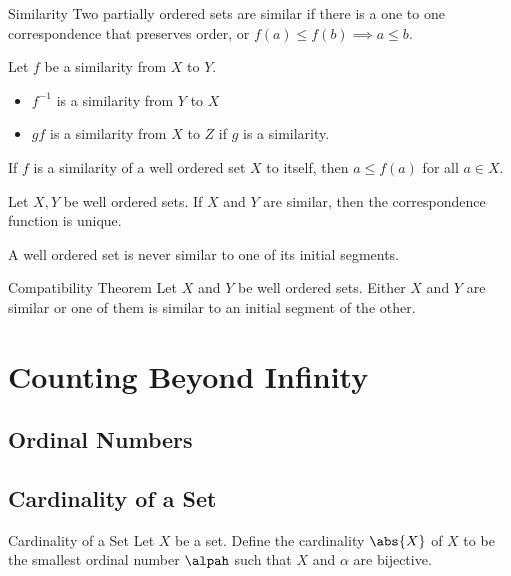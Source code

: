\documentclass[a4paper]{article}
\begin{document}
\begin{defn}{Similarity}{} Two partially ordered sets are similar if there is a one to one correspondence that preserves order, or $f(a)\leq f(b)\implies a\leq b$. 
\end{defn}

\begin{prp}{}{} Let $f$ be a similarity from $X$ to $Y$. 
\begin{itemize}
\item $f^{-1}$ is a similarity from $Y$ to $X$
\item $gf$ is a similarity from $X$ to $Z$ if $g$ is a similarity. 
\end{itemize}
\end{prp}

\begin{thm}{}{} If $f$ is a similarity of a well ordered set $X$ to itself, then $a\leq f(a)$ for all $a\in X$. 
\end{thm}

\begin{thm}{}{} Let $X,Y$ be well ordered sets. If $X$ and $Y$ are similar, then the correspondence function is unique. 
\end{thm}

\begin{thm}{}{} A well ordered set is never similar to one of its initial segments. 
\end{thm}

\begin{thm}{Compatibility Theorem}{} Let $X$ and $Y$ be well ordered sets. Either $X$ and $Y$ are similar or one of them is similar to an initial segment of the other. 
\end{thm}

\pagebreak
\section{Counting Beyond Infinity}
\subsection{Ordinal Numbers}

\subsection{Cardinality of a Set}
\begin{defn}{Cardinality of a Set}{} Let $X$ be a set. Define the cardinality $\abs{X}$ of $X$ to be the smallest ordinal number $\alpah$ such that $X$ and $\alpha$ are bijective. 
\end{defn}
\end{document}

